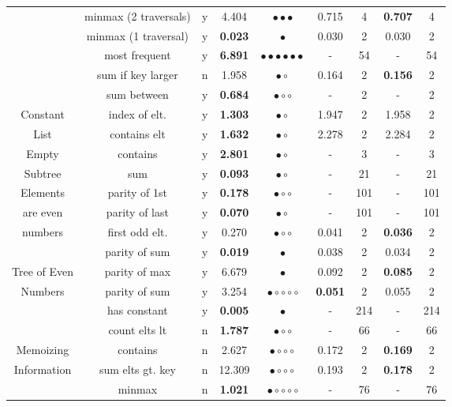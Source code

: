 {\begin{longtable}[h]{|c|c|c|c|c||c|c||c|c|}
  & minmax (2 traversals) & y &  4.404 & $\bullet\bullet\bullet$ &  0.715  & 4 & {\bf 0.707} & 4 \\ 
  & minmax (1 traversal) & y & {\bf 0.023} & $\bullet$ &  0.030  & 2 &  0.030 & 2 \\ 
  & most frequent & y & {\bf 6.891} & $\bullet\bullet\bullet\bullet\bullet\bullet$ & -  & 54 & - & 54 \\ 
  & sum if key larger & n &  1.958 & $\bullet\circ$ &  0.164  & 2 & {\bf 0.156} & 2 \\ 
  & sum between & y & {\bf 0.684} & $\bullet\circ\circ$ & -  & 2 & - & 2 \\ 
			\hline
 Constant  & index of elt.  & y & {\bf 1.303} & $\bullet\circ$ &  1.947  & 2 &  1.958 & 2 \\ 
  List     & contains elt   & y & {\bf 1.632} & $\bullet\circ$ &  2.278  & 2 &  2.284 & 2 \\ 
			\hline
 Empty & contains & y & {\bf 2.801} & $\bullet\circ$ & -  & 3 & - & 3 \\ 
 Subtree & sum & y & {\bf 0.093} & $\bullet\circ$ & -  & 21 & - & 21 \\ 
			\hline
Elements & parity of 1st & y & {\bf 0.178} & $\bullet\circ\circ$ & -  & 101 & - & 101 \\ 
 are even & parity of last & y & {\bf 0.070} & $\bullet\circ$ & -  & 101 & - & 101 \\ 
 numbers   & first odd elt. & y &  0.270 & $\bullet\circ\circ$ &  0.041  & 2 & {\bf 0.036} & 2 \\ 
     & parity of sum  & y & {\bf 0.019} & $\bullet$ &  0.038  & 2 &  0.034 & 2 \\ 
			\hline
  Tree of Even  & parity of max  & y &  6.679 & $\bullet$ &  0.092  & 2 & {\bf 0.085} & 2 \\ 
  Numbers   & parity of sum & y &  3.254 & $\bullet\circ\circ\circ\circ$ & {\bf 0.051}  & 2 &  0.055 & 2 \\ 
			\hline
        & has constant & y & {\bf 0.005} & $\bullet$ & -  & 214 & - & 214 \\ 
        & count elts lt & n & {\bf 1.787} & $\bullet\circ\circ$ & -  & 66 & - & 66 \\ 
 Memoizing   & contains & n &  2.627 & $\bullet\circ\circ\circ$ &  0.172  & 2 & {\bf 0.169} & 2 \\ 
 Information  & sum elts gt. key & n &  12.309 & $\bullet\circ\circ\circ$ &  0.193  & 2 & {\bf 0.178} & 2 \\ 
        & minmax & n & {\bf 1.021} & $\bullet\circ\circ\circ\circ$ & -  & 76 & - & 76 \\ 

\end{longtable}}
